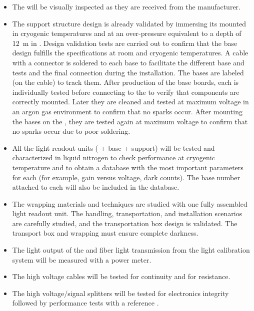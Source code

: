 \begin{itemize}
\item The  will be visually inspected as they are received from the manufacturer.

\item 
The  support structure design is already validated by immersing its mounted  in cryogenic temperatures and at an over-pressure equivalent to a depth of \SI{12}{m} in \lar{}. Design validation tests are carried out to confirm that the  base design fulfills the specifications at room and cryogenic temperatures. A cable with a  connector is soldered to each  base to facilitate the different base and  tests and the final  connection during the installation. The  bases are labeled (on the cable) to track them. After production of the  base boards, each is individually tested before connecting to the  to verify that components are correctly mounted. Later they are cleaned and tested at maximum voltage in an argon gas environment to confirm that no sparks occur. After mounting the bases on the , they are tested again %
at maximum voltage to confirm that no sparks occur due to poor soldering.

\item All the light readout units ( + base + support) will be tested and characterized in liquid nitrogen to check performance at cryogenic temperature and to obtain a database with the most important parameters for each  (for example, gain versus voltage, dark counts). The  base number attached to each  will also be included in the database.

\item The wrapping materials and techniques are studied with one fully assembled light readout unit. The handling, transportation, and installation scenarios are carefully studied, and the transportation box design is validated. The transport box and  wrapping must ensure complete darkness.

\item The light output of the  and fiber light transmission from the light calibration system will be measured with a power meter.

\item The high voltage cables will be tested for continuity and for resistance.

\item The high voltage/signal splitters will be tested for electronics integrity followed by  performance tests with a reference .

\end{itemize}

